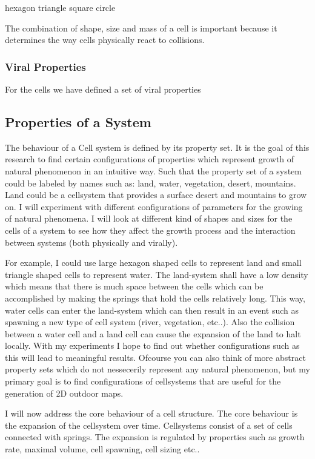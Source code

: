 \documentclass{article}
\begin{document}
hexagon triangle square circle

The combination of shape, size and mass of a cell is important because it determines the way cells physically react to collisions.

\subsubsection{Viral Properties}

For the cells we have defined a set of viral properties




\subsection{Properties of a System}

The behaviour of a Cell system is defined by its property set. 
It is the goal of this research to find certain configurations of properties which represent growth of natural phenomenon in an intuitive way. Such that the property set of a system could be labeled by names such as: land, water, vegetation, desert, mountains. Land could be a cellsystem that provides a surface desert and mountains to grow on. I will experiment with different configurations of parameters for the growing of natural phenomena. I will look at different kind of shapes and sizes for the cells of a system to see how they affect the growth process and the interaction between systems (both physically and virally). 

For example, I could use large hexagon shaped cells to represent land and small triangle shaped cells to represent water. The land-system shall have a low density which means that there is much space between the cells which can be accomplished by making the springs that hold the cells relatively long. This way, water cells can enter the land-system which can then result in an event such as spawning a new type of cell system (river, vegetation, etc..). Also the collision between a water cell and a land cell can cause the expansion of the land to halt locally. With my experiments I hope to find out whether configurations such as this will lead to meaningful results. Ofcourse you can also think of more abstract property sets which do not nessecerily represent any natural phenomenon, but my primary goal is to find configurations of cellsystems that are useful for the generation of 2D outdoor maps.  

I will now address the core behaviour of a cell structure. The core behaviour is the expansion of the cellsystem over time. Cellsystems consist of a set of cells connected with springs. The expansion is regulated by properties such as growth rate, maximal volume, cell spawning, cell sizing etc..    
\end{document}
